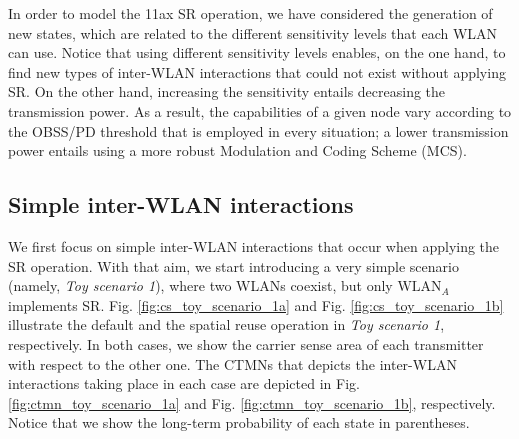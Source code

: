 \documentclass[preprint,12pt]{elsarticle}
\begin{document}
	In order to model the 11ax SR operation, we have considered the generation of new states, which are related to the different sensitivity levels that each WLAN can use. Notice that using different sensitivity levels enables, on the one hand, to find new types of inter-WLAN interactions that could not exist without applying SR. On the other hand, increasing the sensitivity entails decreasing the transmission power. As a result, the capabilities of a given node vary according to the OBSS/PD threshold that is employed in every situation; a lower transmission power entails using a more robust Modulation and Coding Scheme (MCS). 
	
	\subsection{Simple inter-WLAN interactions}
	\label{section:simple_interactions}
	
	We first focus on simple inter-WLAN interactions that occur when applying the SR operation. With that aim, we start introducing a very simple scenario (namely, \emph{Toy scenario 1}), where two WLANs coexist, but only $\text{WLAN}_A$ implements SR. Fig. \ref{fig:cs_toy_scenario_1a} and Fig. \ref{fig:cs_toy_scenario_1b} illustrate the default and the spatial reuse operation in \emph{Toy scenario 1}, respectively. In both cases, we show the carrier sense area of each transmitter with respect to the other one. The CTMNs that depicts the inter-WLAN interactions taking place in each case are depicted in Fig. \ref{fig:ctmn_toy_scenario_1a} and Fig. \ref{fig:ctmn_toy_scenario_1b}, respectively. Notice that we show the long-term probability of each state in parentheses.
	
\end{document}
